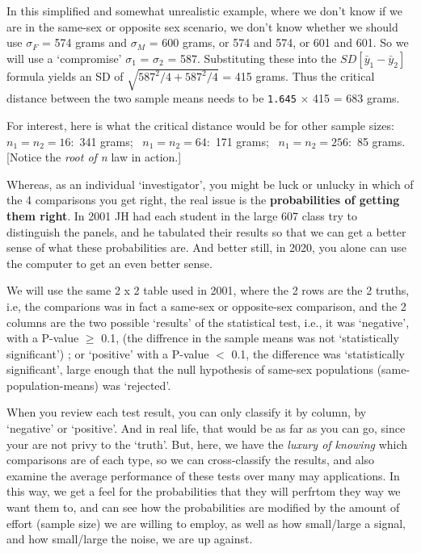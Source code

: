 \documentclass[]{book}
\begin{document}
In this simplified and somewhat unrealistic example, where we don't know if we are in the same-sex or opposite sex scenario, we don't know whether we should use \(\sigma_F\) = 574 grams and \(\sigma_M\) = 600 grams, or 574 and 574, or 601 and 601. So we will use a `compromise' \(\sigma_1\) = \(\sigma_2\) = 587. Substituting these into the \(SD[\bar{y}_1 - \bar{y}_2]\) formula yields an SD of \(\sqrt{587^2/4 + 587^2/4}\) = 415 grams. Thus the critical distance between the two sample means needs to be \texttt{1.645} \(\times\) 415 = 683 grams.

For interest, here is what the critical distance would be for other sample sizes: \(n_1 = n_2 = 16:\) 341 grams; ~\(n_1 = n_2 = 64:\) 171 grams; ~\(n_1 = n_2 = 256:\) 85 grams. {[}Notice the \emph{root of n} law in action.{]}

Whereas, as an individual `investigator', you might be luck or unlucky in which of the 4 comparisons you get right, the real issue is the \textbf{probabilities of getting them right}. In 2001 JH had each student in the large 607 class try to distinguish the panels, and he tabulated their results so that we can get a better sense of what these probabilities are. And better still, in 2020, you alone can use the computer to get an even better sense.

We will use the same 2 x 2 table used in 2001, where the 2 rows are the 2 truths, i.e, the comparions was in fact a same-sex or opposite-sex comparison, and the 2 columns are the two possible `results' of the statistical test, i.e., it was `negative', with a P-value \(\ge\) 0.1, (the diffrence in the sample means was not `statistically significant') ; or `positive' with a P-value \(<\) 0.1, the difference was `statistically significant', large enough that the null hypothesis of same-sex populations (same-population-means) was `rejected'.

When you review each test result, you can only classify it by column, by `negative' or `positive'. And in real life, that would be as far as you can go, since your are not privy to the `truth'. But, here, we have the \emph{luxury of knowing} which comparisons are of each type, so we can cross-classify the results, and also examine the average performance of these tests over many may applications. In this way, we get a feel for the probabilities that they will perfrtom they way we want them to, and can see how the probabilities are modified by the amount of effort (sample size) we are willing to employ, as well as how small/large a signal, and how small/large the noise, we are up against.
\end{document}
